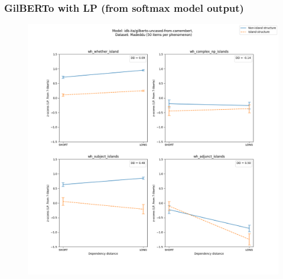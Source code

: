 \subsubsection{GilBERTo with LP (from softmax model output)}
\begin{figure}[h]
	\centering
	\includegraphics[width=1\textwidth]{images/AppendixA/Madeddu_wh_idb-ita_gilberto-uncased-from-camembert_LP-zscores-likert-2022-07-11.png} 
\end{figure}

\clearpage
